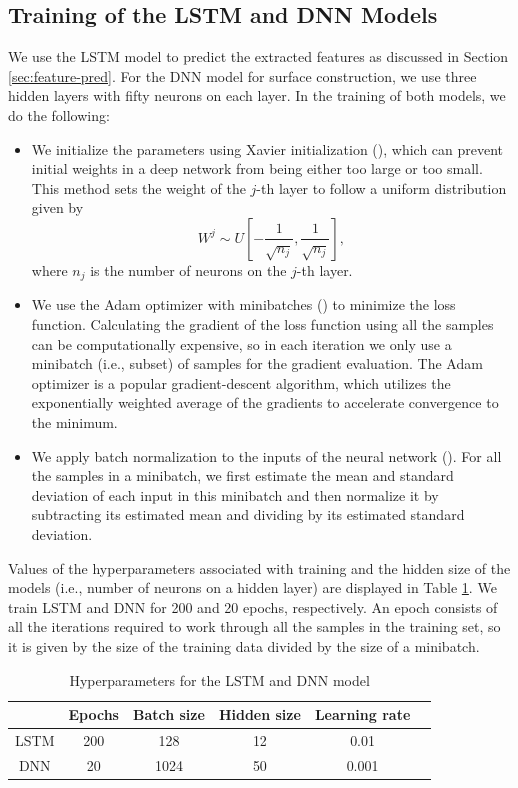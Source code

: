 \documentclass[11pt,a4paper]{article}
\theoremstyle{remark}
\begin{document}
\subsection{Training of the LSTM and DNN Models}
We use the LSTM model to predict the extracted features as discussed in Section \ref{sec:feature-pred}. For the DNN model for surface construction, we use three hidden layers with fifty neurons on each layer. In the training of both models, we do the following:
\begin{itemize}
	\item We initialize the parameters using Xavier initialization (\cite{glorot2010understanding}), which can prevent initial weights in a deep network from being either too large or too small. This method sets the weight of the $j$-th layer to follow a uniform distribution given by 
	\begin{equation}	
	W^{j} \sim U\left[-\frac{1}{\sqrt{n_{j}}}, \frac{1}{\sqrt{n_{j}}}\right], 
	\end{equation}
	where $n_j$ is the number of neurons on the $j$-th layer. 
	
	\item We use the Adam optimizer with minibatches (\cite{kingma2014adam}) to minimize the loss function. Calculating the gradient of the loss function using all the samples can be computationally expensive, so in each iteration we only use a minibatch (i.e., subset) of samples for the gradient evaluation. The Adam optimizer is a popular gradient-descent algorithm, which utilizes the exponentially weighted average of the gradients to accelerate convergence to the minimum.
	
	
	\item We apply batch normalization to the inputs of the neural network (\cite{ioffe2015batch}). For all the samples in a minibatch, we first estimate the mean and standard deviation of each input in this minibatch and then normalize it by subtracting its estimated mean and dividing by its estimated standard deviation. 
	
	\end{itemize}

Values of the hyperparameters associated with training and the hidden size of the models (i.e., number of neurons on a hidden layer) are displayed in Table \ref{tab:hyperparameter}. 
We train LSTM and DNN for 200 and 20 epochs, respectively. An epoch consists of all the iterations required to work through all the samples in the training set, so it is given by the size of the training data divided by the size of a minibatch.
\begin{table}[htbp!]
	\centering
	\begin{tabular}{cccccc}
		\hline
		& Epochs  &  Batch size    & Hidden size & Learning rate \\
		\hline
		LSTM&   200   & 128      & 12 & 0.01\\
		DNN& 20    &1024    & 50 & 0.001 \\
		\hline
	\end{tabular}%
	\caption{Hyperparameters for the LSTM and DNN model}
	\label{tab:hyperparameter}
\end{table}
\end{document}
